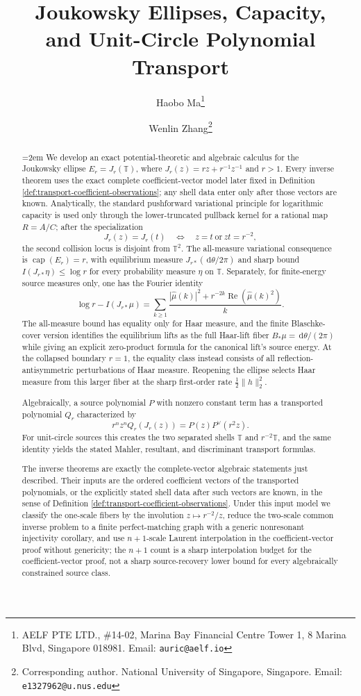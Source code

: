 \documentclass[12pt,a4paper]{article}
\title{Joukowsky Ellipses, Capacity,\\
and Unit-Circle Polynomial Transport}
\author{
  Haobo Ma\thanks{\raggedright AELF PTE LTD., \#14-02, Marina Bay Financial Centre Tower 1, 8 Marina Blvd, Singapore 018981. Email: \texttt{auric@aelf.io}}
  \and
  Wenlin Zhang\thanks{\raggedright Corresponding author. National University of Singapore, Singapore. Email: \texttt{e1327962@u.nus.edu}}
}
\date{}
\theoremstyle{plain}
\theoremstyle{definition}
\numberwithin{equation}{section}
\newcommand{\TT}{\mathbb{T}}
\newcommand{\dd}{\,\mathrm{d}}
\begin{document}
\maketitle

\begin{abstract}
\emergencystretch=2em
We develop an exact potential-theoretic and algebraic calculus for the
Joukowsky ellipse \(E_r=J_r(\TT)\), where
\(J_r(z)=rz+r^{-1}z^{-1}\) and \(r>1\).  Every inverse theorem uses the
exact complete coefficient-vector model later fixed in Definition
\ref{def:transport-coefficient-observations}; any shell data enter only
after those vectors are known.  Analytically, the standard
pushforward variational principle for logarithmic capacity is used only
through the lower-truncated pullback kernel for a rational map
\(R=A/C\); after the specialization
\[
J_r(z)=J_r(t)\quad\Longleftrightarrow\quad z=t
\ \text{or}\ zt=r^{-2},
\]
the second collision locus is disjoint from \(\TT^2\).  The all-measure
variational consequence is
\(\operatorname{cap}(E_r)=r\), with equilibrium measure
\(J_{r\ast}(\dd\theta/2\pi)\) and sharp bound
\(I(J_{r\ast}\eta)\le\log r\) for every probability measure \(\eta\) on
\(\TT\).  Separately, for finite-energy source measures only, one has the
Fourier identity
\[
\log r-I(J_{r\ast}\mu)
=\sum_{k\ge1}\frac{|\widehat\mu(k)|^2+
r^{-2k}\operatorname{Re}(\widehat\mu(k)^2)}{k}.
\]
The all-measure bound has equality only for Haar measure, and the finite
Blaschke-cover version identifies the equilibrium lifts as the full
Haar-lift fiber \(B_\ast\mu=\dd\theta/(2\pi)\) while giving an explicit
zero-product formula for the canonical lift's source energy.
At the collapsed boundary \(r=1\), the equality class instead consists
of all reflection-antisymmetric perturbations of Haar measure.  Reopening
the ellipse selects Haar measure from this larger fiber at the sharp
first-order rate \(\frac12\|h\|_2^2\).

Algebraically, a source polynomial \(P\) with nonzero constant term has
a transported polynomial \(Q_r\) characterized by
\[
r^nz^nQ_r(J_r(z))=P(z)P^\vee(r^2z).
\]
For unit-circle sources this creates the two separated shells
\(\TT\) and \(r^{-2}\TT\), and the same identity yields the stated
Mahler, resultant, and discriminant transport formulas.

The inverse theorems are exactly the complete-vector algebraic
statements just described.  Their inputs are the ordered coefficient
vectors of the transported polynomials, or the explicitly stated shell
data after such vectors are known, in the sense of Definition
\ref{def:transport-coefficient-observations}.  Under this input model we classify the
one-scale fibers by the involution \(z\mapsto r^{-2}/z\), reduce the
two-scale common inverse problem to a finite perfect-matching graph with
a generic nonresonant injectivity corollary, and use \(n+1\)-scale
Laurent interpolation in the coefficient-vector proof without
genericity; the \(n+1\) count is a sharp interpolation budget for the
coefficient-vector proof, not a sharp source-recovery lower bound for
every algebraically constrained source class.


\end{abstract}
\end{document}

